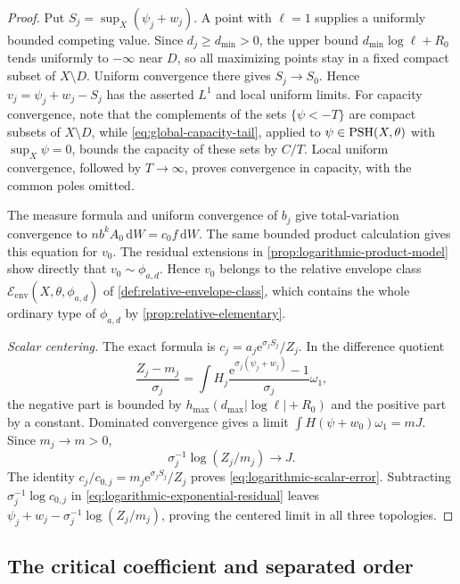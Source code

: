 \begin{proof}
Put $S_j=\sup_X(\psi_j+w_j)$. A point with $\ell=1$ supplies a uniformly bounded competing value. Since $d_j\geq d_{\min}>0$, the upper bound $d_{\min}\log\ell+R_0$ tends uniformly to $-\infty$ near $D$, so all maximizing points stay in a fixed compact subset of $X\setminus D$. Uniform convergence there gives $S_j\to S_0$. Hence $v_j=\psi_j+w_j-S_j$ has the asserted $L^1$ and local uniform limits. For capacity convergence, note that the complements of the sets $\{\psi<-T\}$ are compact subsets of $X\setminus D$, while \eqref{eq:global-capacity-tail}, applied to $\psi\in\mathrm{PSH}(X,\theta)$ with $\sup_X\psi=0$, bounds the capacity of these sets by $C/T$. Local uniform convergence, followed by $T\to\infty$, proves convergence in capacity, with the common poles omitted.

The measure formula and uniform convergence of $b_j$ give total-variation convergence to $n b^kA_0\,\mathrm{d}W=c_0 f\,\mathrm{d}W$. The same bounded product calculation gives this equation for $v_0$. The residual extensions in \cref{prop:logarithmic-product-model} show directly that $v_0\sim\phi_{a,d}$. Hence $v_0$ belongs to the relative envelope class $\mathcal E_{\mathrm{env}}(X,\theta,\phi_{a,d})$ of \cref{def:relative-envelope-class}, which contains the whole ordinary type of $\phi_{a,d}$ by \cref{prop:relative-elementary}.

\emph{Scalar centering.} The exact formula is $c_j=a_j\mathrm{e}^{\sigma_j S_j}/Z_j$. In the difference quotient
\[
 \frac{Z_j-m_j}{\sigma_j}
   =\int H_j\frac{\mathrm{e}^{\sigma_j(\psi_j+w_j)}-1}{\sigma_j}\omega_1,
\]
the negative part is bounded by $h_{\max}(d_{\max}|\log\ell|+R_0)$ and the positive part by a constant. Dominated convergence gives a limit $\int H(\psi+w_0)\omega_1=mJ$. Since $m_j\to m>0$,
\[
 \sigma_j^{-1}\log(Z_j/m_j)\longrightarrow J.
\]
The identity $c_j/c_{0,j}=m_j\mathrm{e}^{\sigma_j S_j}/Z_j$ proves \eqref{eq:logarithmic-scalar-error}. Subtracting $\sigma_j^{-1}\log c_{0,j}$ in \eqref{eq:logarithmic-exponential-residual} leaves $\psi_j+w_j-\sigma_j^{-1}\log(Z_j/m_j)$, proving the centered limit in all three topologies.
\end{proof}

\subsection{The critical coefficient and separated order}

